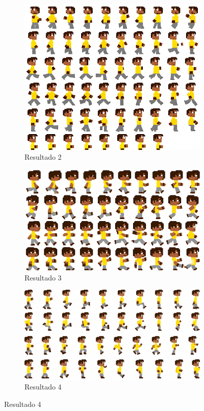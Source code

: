 \begin{figure}[htbp]
\begin{subfigure}{0.45\linewidth}
        \includegraphics[width=1\linewidth]{figs/geminiPro/chat9/2res2.PNG}
        \caption{\small Resultado 2}
        \label{fig:geminiProSheet4b}
    \end{subfigure}\hfill
    \begin{subfigure}{0.45\linewidth}
        \includegraphics[width=1\linewidth]{figs/geminiPro/chat9/2res3.PNG}
        \caption{\small Resultado 3}
        \label{fig:geminiProSheet4c}
    \end{subfigure}\hfill
    \begin{subfigure}{0.45\linewidth}
        \includegraphics[width=1\linewidth]{figs/geminiPro/chat9/2res4.PNG}
        \caption{\small Resultado 4}
        \label{fig:geminiProSheet4d}
    \end{subfigure}\hfill



\end{figure}
